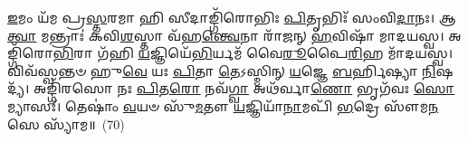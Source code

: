 \-\ul{𑌇}\-𑌮𑌂 𑌯᳴𑌮 𑌪𑍍𑌰\-\ul{𑌸𑍍𑌤}\-𑌰𑌮𑌾 𑌹𑌿 𑌸𑍀𑌦𑌾𑌙𑍍𑌗𑌿᳴𑌰𑍋𑌭𑌿𑌃 \ul{𑌪𑌿}\-𑌤𑍃𑌭𑌿𑌃᳴ 𑌸𑌂𑌵𑌿\-\ul{𑌦𑌾}\-𑌨𑌃। 𑌆 \ul{𑌤𑍍𑌵𑌾} 𑌮𑌨𑍍𑌤𑍍𑌰𑌾𑌃॑ 𑌕𑌵𑌿\-\ul{𑌶}\-𑌸𑍍𑌤𑌾 𑌵᳴𑌹\-\ul{𑌨𑍍𑌤𑍍𑌵𑍇}\-𑌨𑌾 𑌰𑌾᳴𑌜𑌨𑍍 \ul{𑌹}\-𑌵𑌿𑌷𑌾᳴ 𑌮𑌾𑌦𑌯𑌸𑍍𑌵। 𑌅𑌙𑍍𑌗𑌿᳴𑌰𑍋\-\ul{𑌭𑌿}\-𑌰𑌾 𑌗᳴𑌹𑌿 \ul{𑌯}\-𑌜𑍍𑌞𑌿𑌯𑍇᳴\-\ul{𑌭𑌿}\-𑌰𑍍𑌯𑌮᳴ 𑌵𑍈\-\ul{𑌰𑍂}\-𑌪𑍈\-\ul{𑌰𑌿}\-𑌹 𑌮𑌾᳴𑌦𑌯𑌸𑍍𑌵। 𑌵𑌿𑌵᳴𑌸𑍍𑌵𑌨𑍍𑌤𑍞 𑌹𑍁\-\ul{𑌵𑍇} 𑌯𑌃 \ul{𑌪𑌿}\-𑌤𑌾 \ul{𑌤𑍇}\-\-𑌽𑌸𑍍𑌮𑌿𑌨𑍍 \ul{𑌯}\-𑌜𑍍𑌞𑍇 \ul{𑌬}\-𑌰𑍍\mbox{}𑌹𑌿𑌷𑍍𑌯𑌾 \ul{𑌨𑌿}\-𑌷𑌦𑍍𑌯᳴। 𑌅𑌙𑍍𑌗𑌿᳴𑌰𑌸𑍋 𑌨𑌃 \ul{𑌪𑌿}\-𑌤\-\ul{𑌰𑍋} 𑌨𑌵᳴\-\ul{𑌗𑍍𑌵𑌾} 𑌅𑌥᳴𑌰𑍍𑌵𑌾\-\ul{𑌣𑍋} 𑌭𑍃𑌗᳴𑌵𑌃 \ul{𑌸𑍋}\-𑌮𑍍𑌯𑌾𑌸𑌃᳴। 𑌤𑍇𑌷𑌾𑌂॑ \ul{𑌵}\-𑌯𑍞 𑌸𑍁᳴\-\ul{𑌮}\-𑌤𑍗 \ul{𑌯}\-𑌜𑍍𑌞𑌿𑌯𑌾᳴\-\ul{𑌨𑌾}\-𑌮𑌪𑌿᳴ \ul{𑌭}\-𑌦𑍍𑌰𑍇 𑌸𑍗᳴𑌮\-\ul{𑌨}\-𑌸𑍇 𑌸𑍍𑌯𑌾᳴𑌮॥~(70)

\prashnaend[{\-\ul{𑌸}\-𑌮𑌿𑌧𑍋᳴ \ul{𑌯𑌾}\-𑌜𑍍𑌯𑌾᳴ 𑌤\-\ul{𑌸𑍍𑌮𑌾}\-𑌨𑍍𑌨𑌾\-\ul{𑌭𑌾}\-𑌗𑍞 𑌹𑌿 𑌤𑌮𑌨𑍍𑌵𑌿𑌤𑍍𑌯𑌾᳴𑌹 \ul{𑌪𑍍𑌰}\-𑌜𑌾 𑌵𑌾 \ul{𑌆}\-𑌹𑍇𑌤𑍍𑌯𑌾᳴𑌹 \ul{𑌯𑍁}\-𑌕𑍍𑌷𑍍𑌵𑌾 𑌹𑌿 𑌸᳴\-\ul{𑌪𑍍𑌤}\-𑌤𑌿𑌃॥70॥ \ul{𑌸}\-𑌮𑌿𑌧𑌃᳴ 𑌸𑍗𑌮\-\ul{𑌨}\-𑌸𑍇 𑌸𑍍𑌯𑌾᳴𑌮॥}]

